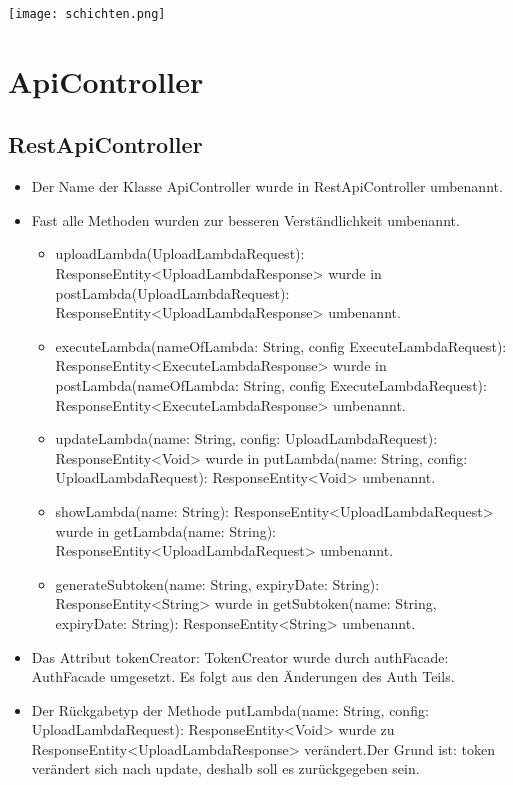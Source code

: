 \documentclass[a4paper,20pt,oneside]{book}
\begin{document}
	\vspace{0.5cm}
	\texttt{[image: schichten.png]}
	\section{ApiController} 
	\subsection{RestApiController}
	\vspace{0.5cm}
	\begin{itemize}
	\item Der Name der Klasse ApiController wurde in RestApiController umbenannt.\linebreak
	\item Fast alle Methoden wurden zur besseren Verständlichkeit umbenannt.\linebreak
	\begin{itemize}
	\item  uploadLambda(UploadLambdaRequest): ResponseEntity<UploadLambdaResponse> wurde in postLambda(UploadLambdaRequest): ResponseEntity<UploadLambdaResponse> umbenannt.\linebreak
	\item  executeLambda(nameOfLambda: String, config ExecuteLambdaRequest):\\ ResponseEntity<ExecuteLambdaResponse> wurde in postLambda(nameOfLambda: String, config ExecuteLambdaRequest): ResponseEntity<ExecuteLambdaResponse> umbenannt.\linebreak
	\item  updateLambda(name: String, config: UploadLambdaRequest): ResponseEntity<Void> wurde in putLambda(name: String, config: UploadLambdaRequest): ResponseEntity<Void> umbenannt.\linebreak
	\item showLambda(name: String): ResponseEntity<UploadLambdaRequest> wurde in getLambda(name: String): ResponseEntity<UploadLambdaRequest> umbenannt.\linebreak
	\item generateSubtoken(name: String, expiryDate: String): ResponseEntity<String>
 wurde in  getSubtoken(name: String, expiryDate: String): ResponseEntity<String>
 umbenannt.\linebreak	
	\end{itemize}
	\item Das Attribut tokenCreator: TokenCreator  wurde durch authFacade: AuthFacade umgesetzt. Es folgt aus den Änderungen des Auth Teils. \linebreak
	\item Der Rückgabetyp der Methode putLambda(name: String, config: UploadLambdaRequest): ResponseEntity<Void> wurde zu ResponseEntity<UploadLambdaResponse> verändert.Der Grund ist: token verändert sich nach update, deshalb soll es zurückgegeben sein.\linebreak
	
	\end{itemize}
\end{document}
